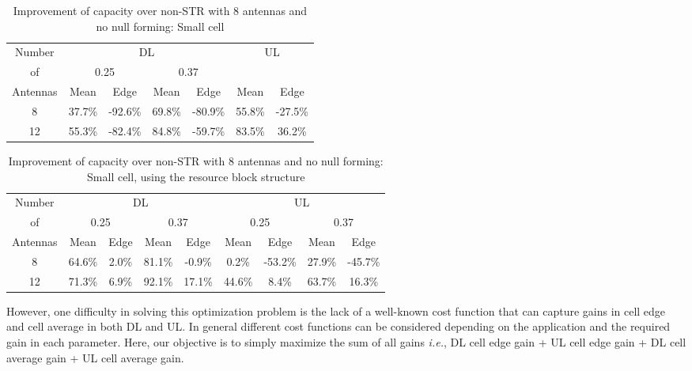 \documentclass[twocolumn]{IEEEtran}
\begin{document}
\begin{center}
\begin{table*}[ht]
\centering \caption{Improvement of capacity over non-STR with 8
antennas and no null forming: Small cell}
\begin{small}
\begin{tabular}{c||c|c|c|c||c|c}
\hline
  \hline
Number &\multicolumn{4}{c||}{DL}  &\multicolumn{2}{c}{UL}  \\
    \cline{2-7}
 of   & \multicolumn{2}{c|}{0.25} & \multicolumn{2}{c||}{0.37} & \multicolumn{2}{c}{}\\
\cline{2-7}
 Antennas & Mean & Edge & Mean & Edge & Mean & Edge \\
  \hline
  \hline
  8 & 37.7\% & -92.6\% & 69.8\% & -80.9\% & 55.8\% & -27.5\%  \\
 12 & 55.3\% & -82.4\% & 84.8\% & -59.7\% & 83.5\% &  36.2\%  \\
\hline \hline
\end{tabular}
\end{small}
\end{table*}
\end{center}

\begin{center}
\begin{table*}[ht]
\centering \caption{Improvement of capacity over non-STR with 8
antennas and no null forming: Small cell, using the resource block
structure}
\begin{small}
\begin{tabular}{c||c|c|c|c||c|c|c|c}
\hline
  \hline
Number &\multicolumn{4}{c||}{DL}  &\multicolumn{4}{c}{UL}  \\
    \cline{2-9}
 of   & \multicolumn{2}{c|}{0.25} & \multicolumn{2}{c||}{0.37} & \multicolumn{2}{c|}{0.25} & \multicolumn{2}{c}{0.37}\\
\cline{2-9}
 Antennas & Mean & Edge & Mean & Edge & Mean & Edge & Mean & Edge \\
  \hline
  \hline
  8 & 64.6\% & 2.0\% & 81.1\% & -0.9\% & 0.2\% & -53.2\% & 27.9\% & -45.7\% \\
 12 & 71.3\% & 6.9\% & 92.1\% & 17.1\% &44.6\% &   8.4\% & 63.7\% & 16.3\% \\
\hline \hline
\end{tabular}
\end{small}
\end{table*}
\end{center}


However, one difficulty in solving this optimization problem is the
lack of a well-known cost function that can capture gains in cell
edge and cell average in both DL and UL. In general different cost
functions can be considered depending on the application and the
required gain in each parameter. Here, our objective is to simply
maximize the sum of all gains \emph{i.e.}, DL cell edge gain + UL
cell edge gain + DL cell average gain + UL cell average gain.
\end{document}
